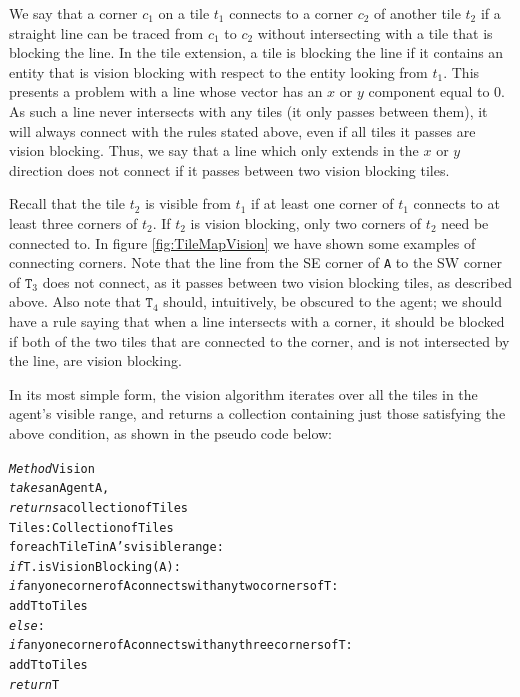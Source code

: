 We say that a corner $c_{1}$ on a tile $t_{1}$ connects to a corner
$c_{2}$ of another tile $t_{2}$ if a straight line can be traced
from $c_{1}$ to $c_{2}$ without intersecting with a tile that is
blocking the line. In the tile extension, a tile is blocking the line
if it contains an entity that is vision blocking with respect to the
entity looking from $t_{1}$. This presents a problem with a line
whose vector has an $x$ or $y$ component equal to 0. As such a line
never intersects with any tiles (it only passes between them), it
will always connect with the rules stated above, even if all tiles
it passes are vision blocking. Thus, we say that a line which only
extends in the $x$ or $y$ direction does not connect if it passes
between two vision blocking tiles.

Recall that the tile $t_{2}$ is visible from $t_{1}$ if at least
one corner of $t_{1}$ connects to at least three corners of $t_{2}$.
If $t_{2}$ is vision blocking, only two corners of $t_{2}$ need
be connected to. In figure \ref{fig:TileMapVision} we have shown
some examples of connecting corners. Note that the line from the SE
corner of \texttt{A} to the SW corner of $\mathtt{T}_{3}$ does not
connect, as it passes between two vision blocking tiles, as described
above. Also note that $\mathtt{T}_{4}$ should, intuitively, be obscured
to the agent; we should have a rule saying that when a line intersects
with a corner, it should be blocked if both of the two tiles that
are connected to the corner, and is not intersected by the line, are
vision blocking.

In its most simple form, the vision algorithm iterates over all the
tiles in the agent's visible range, and returns a collection containing
just those satisfying the above condition, as shown in the pseudo
code below:

\begin{alltt}
\textit{Method} Vision 
        \textit{takes} an Agent A, 
        \textit{returns} a collection of Tiles
    Tiles : Collection of Tiles
    for each Tile T in A's visible range:
        \textit{if} T.isVisionBlocking(A):
            \textit{if} any one corner of A connects with any two corners of T:
                add T to Tiles
        \textit{else}:
            \textit{if} any one corner of A connects with any three corners of T:
                add T to Tiles
    \textit{return} T
\end{alltt}

